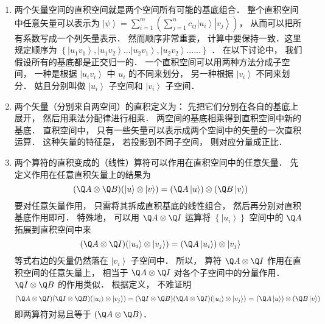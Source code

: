 
\begin{enumerate}
\item 两个矢量空间的直积空间就是两个空间所有可能的基底组合． 整个直积空间中任意矢量可以表示为 $\left| \psi  \right\rangle  = \sum\limits_{i = 1}^m {\left( {\sum\limits_{j = 1}^n {{c_{ij}}\left| {{u_i}} \right\rangle \left| {{v_j}} \right\rangle } } \right)} $，  从而可以把所有系数写成一个列矢量表示． 然而顺序非常重要， 计算中要保持一致．这里规定顺序为 $\left\{ {\left| {{u_1}{v_1}} \right\rangle ,\left| {{u_1}{v_2}} \right\rangle ...\left| {{u_2}{v_1}} \right\rangle ,\left| {{u_2}{v_2}} \right\rangle ......} \right\}$ 
．  在以下讨论中， 我们假设所有的基底都是正交归一的． 一个直积空间可以用两种方法分成子空间， 一种是根据 $\left| {{u_i}{v_i}} \right\rangle $ 中 ${u_i}$  的不同来划分， 另一种根据 $\left| {{v_i}} \right\rangle$ 不同来划分． 姑且分别叫做 $\left| {{u_i}} \right\rangle $ 子空间和 $\left| {{v_i}} \right\rangle $ 子空间．

\item 两个矢量（分别来自两空间）的直积定义为： 先把它们分别在各自的基底上展开， 然后用乘法分配律进行相乘． 两空间的基底相乘得到直积空间中新的基底． 直积空间中， 只有一些矢量可以表示成两个空间中的矢量的一次直积运算． 这种矢量的特征是， 若投影到不同子空间， 则对应分量成正比．

\item 两个算符的直积变成的（线性）算符可以作用在直积空间中的任意矢量． 先定义作用在任意直积矢量上的结果为
 \begin{equation}
  (\Q A \otimes \Q B)(\left| u \right\rangle  \otimes \left| v \right\rangle ) = (\Q A\left| u \right\rangle ) \otimes (\Q B\left| v \right\rangle )
\end{equation}
要对任意矢量作用， 只需将其拆成直积基底的线性组合， 然后再分别对直积基底作用即可． 特殊地， 可以用 $\Q A \otimes \Q I$ 运算将 $\left\{ {\left| {{u_i}} \right\rangle } \right\}$  空间中的 $\Q A$ 拓展到直积空间中来
 \begin{equation}
  (\Q A \otimes \Q I)(\left| {{u_i}} \right\rangle  \otimes \left| {{v_j}} \right\rangle ) = (\Q A\left| {{u_i}} \right\rangle ) \otimes \left| {{v_j}} \right\rangle 
\end{equation}
等式右边的矢量仍然落在 $\left| {{v_i}} \right\rangle $ 子空间中． 所以， 算符 $\Q A \otimes \Q I$ 作用在直积空间的任意矢量上， 相当于 $\Q A \otimes \Q I$ 对各个子空间中的分量作用． $\Q I \otimes \Q B$ 的作用类似． 根据定义， 不难证明
 \begin{equation}
  (\Q A \otimes \Q I)(\Q I \otimes \Q B)(\left| {{u_i}} \right\rangle  \otimes \left| {{v_j}} \right\rangle ) = (\Q I \otimes \Q B)(\Q A \otimes \Q I)(\left| {{u_i}} \right\rangle  \otimes \left| {{v_j}} \right\rangle ){\text{ = }}(\Q A\left| u \right\rangle ) \otimes (\Q B\left| v \right\rangle )
\end{equation}
即两算符对易且等于 $(\Q A \otimes \Q B)$． 


\end{enumerate}
